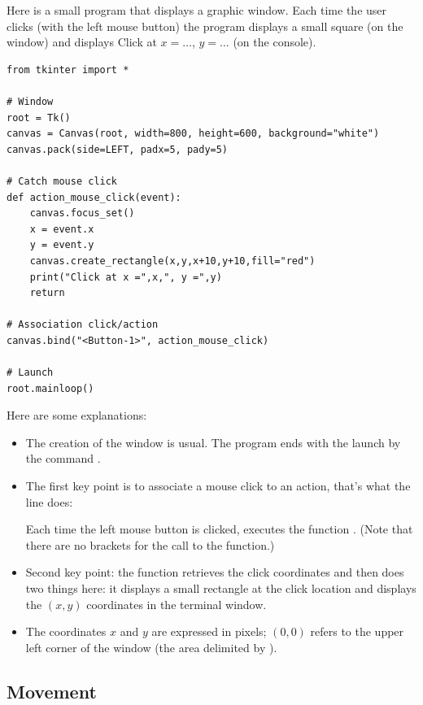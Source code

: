 \documentclass[11pt,class=report,crop=false]{standalone}
\begin{document}
Here is a small program that displays a graphic window. Each time the user clicks (with the left mouse button) the program displays a small square (on the window) and displays \og{}Click at $x=\ldots$, $y=\ldots$\fg{} (on the console).

\begin{lstlisting}
from tkinter import *

# Window
root = Tk()
canvas = Canvas(root, width=800, height=600, background="white")
canvas.pack(side=LEFT, padx=5, pady=5)

# Catch mouse click
def action_mouse_click(event):
    canvas.focus_set()
    x = event.x
    y = event.y
    canvas.create_rectangle(x,y,x+10,y+10,fill="red")
    print("Click at x =",x,", y =",y)
    return

# Association click/action
canvas.bind("<Button-1>", action_mouse_click)

# Launch
root.mainloop()
\end{lstlisting}


Here are some explanations:
\begin{itemize}
  \item The creation of the window is usual. The program ends with the launch by the command  .
  
  \item The first key point is to associate a mouse click to an action, that's what the line does: 

Each time the left mouse button is clicked, \Python{} executes the function . (Note that there are no brackets for the call to the function.)

   \item Second key point: the  function retrieves the click coordinates and then does two things here: it displays a small rectangle at the click location and displays the $(x,y)$ coordinates in the terminal window.
   
   \item The coordinates $x$ and $y$ are expressed in pixels; $(0,0)$ refers to the upper left corner of the window (the area delimited by ).
\end{itemize}


\subsection{Movement}
\end{document}
